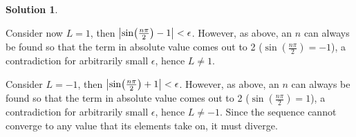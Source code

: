 \documentclass[10pt]{article}
\theoremstyle{definition}
\newtheorem{soln}{Solution}
\begin{document}
\begin{soln}
\begin{enumerate}[label=(\alph*)]
          Consider now $L=1$, then $\abs{\sin(\frac{n\pi}{2})-1}<\epsilon$. However, as above, an $n$ can always be found so that
          the term in absolute value comes out to 2 ($\sin(\frac{n\pi}{2})=-1$), a contradiction for arbitrarily small $\epsilon$, hence
          $L\neq 1$.


          Consider $L=-1$, then $\abs{\sin(\frac{n\pi}{2})+1}<\epsilon$. However, as above, an $n$ can always be found so that
          the term in absolute value comes out to 2 ($\sin(\frac{n\pi}{2})=1$), a contradiction for arbitrarily small $\epsilon$, hence
          $L\neq -1$. Since the sequence cannot converge to any value that its elements take on, it must diverge.
  \end{enumerate}
\end{soln}
\end{document}
